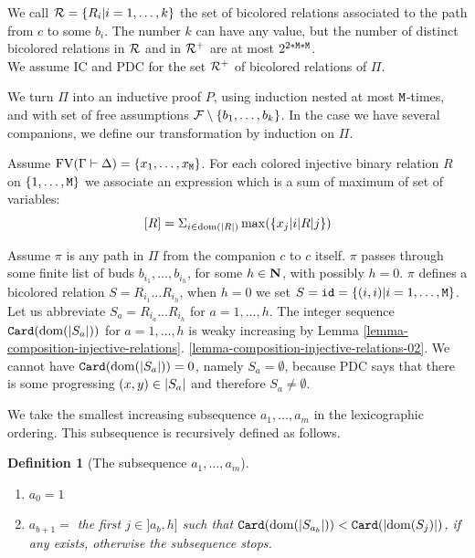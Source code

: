 \documentclass{lmcs}
\newtheorem{definition}[theorem]{Definition}
\begin{document}
We call ${\mathcal R} = \{R_i | i=1, \ldots, k\}$
the set of bicolored relations associated to the path from $c$ to some $b_i$. The number $k$
can have any value, but the number of distinct bicolored relations in ${\mathcal R}$ and in ${\mathcal R}^+$
are at most $2^{2*{\tt M}*{\tt M}}$.
\\
  
We assume IC and PDC for the set ${\mathcal R}^+$ of bicolored relations of $\Pi$.

We turn $\Pi$ into an inductive proof $P$, using
induction nested at most ${\tt M}$-times, and with set of free assumptions 
${\mathcal F} \setminus \{b_1, \ldots, b_k\}$. 
In the case we have several companions, we define our transformation 
by induction on $\Pi$.

Assume ${{\rm FV}}(\Gamma \vdash \Delta) = \{x_1, \ldots, x_{{\tt M}}\}$. For each
colored injective binary relation $R$ on $\{1, \ldots, {{\tt M}}\}$ we associate an
expression which is a sum of maximum of set of variables:
$$
[R] 
= 
\Sigma_{i \in {\rm dom}({| R |})} \max(\{x_j | i {| R |} j\})
$$

Assume $\pi$ is any path in $\Pi$ from the companion $c$ to $c$ itself. 
$\pi$ passes through some finite list of buds $b_{i_1}, \ldots, b_{i_h}$, for some $h \in {\bf N}$,
with possibly $h=0$. $\pi$ defines a bicolored relation $S = R_{i_1}  \ldots  R_{i_h}$,
when $h=0$ we set $S={\tt id}=\{(i,i) | i=1, \ldots, {\tt M}\}$.
Let us abbreviate $S_a =  R_{i_a} \ldots  R_{i_h}$ for $a=1, \ldots,h$.
The integer sequence ${\tt Card}({\rm dom}({| S_a |}))$ for $a=1, \ldots,h$ is weaky increasing
by Lemma \ref{lemma-composition-injective-relations}.
\ref{lemma-composition-injective-relations-02}. 
We cannot have ${\tt Card}({\rm dom}({| S_a |})) = 0$, namely $S_a=\emptyset$,
because PDC says that there is some progressing $(x,y) \in {| S_a |}$
and therefore $S_a \not = \emptyset$.


We take the smallest increasing subsequence ${a_1, \ldots, a_m}$ in the lexicographic ordering. 
This subsequence is recursively defined as follows. 


\begin{definition}[The subsequence ${a_1, \ldots, a_m}$]
\begin{enumerate}
\item
$a_0 = 1$
\item
$a_{b+1}=$ the first $j \in ]a_b,h]$
such that ${\tt Card}({\rm dom}({| S_{a_b} |})) < {\tt Card}({| {\rm dom}(S_j) |})$,
if any exists, otherwise the subsequence stops. 
\end{enumerate}
\end{definition}
\end{document}
